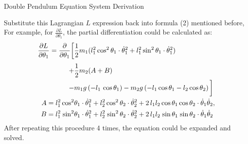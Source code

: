 \documentclass[aspectratio=169, 12pt]{beamer}
\begin{document}
\begin{frame}{Double Pendulum Equation System Derivation}

	\small Substitute this Lagrangian $L$ expression back into formula (2) mentioned before, \\[5pt]
	For example, for $\frac{\partial L}{\partial \theta_1}$, the partial differentiation could be calculated as:
	\begin{align*}
		\frac{\partial L}{\partial \theta_1} = \frac{\partial}{\partial \theta_1} \bigg[ & \frac{1}{2} m_1 (l_1^2 \cos^2{\theta_1}\cdot\dot{\theta}_1^2+l_1^2\sin^2{\theta_1}\cdot\dot{\theta}_1^2)                                                                                       \\[3pt]
		+                                                                                & \frac{1}{2} m_2 (A+B)                                                                                                                                                                          \\
		-                                                                                & m_1g\left( -l_1\,\cos{\theta_1} \right)-m_2g\left( -l_1\cos{\theta_1}-l_2\cos{\theta_2} \right) \bigg]                                                                                         \\
		A = l_1^2\cos^2                                                                  & {\theta_1}\cdot\dot{\theta}_1^2+l_2^2\cos^2{\theta}_2\cdot\dot{\theta}_2^2+2\,l_1l_2\cos{\theta_1}\cos{\theta_2}\cdot\dot{\theta}_1\dot{\theta}_2,                                             \\
		B = l_1^2\hspace{0.11em}\sin^2                                                   & {\theta_1}\cdot\dot{\theta}_1^2+l_2^2\hspace{0.11em}\sin^2{\theta}_2\cdot\dot{\theta}_2^2+2\,l_1l_2\hspace{0.11em}\sin{\theta_1}\hspace{0.11em}\sin{\theta_2}\cdot\dot{\theta}_1\dot{\theta}_2
	\end{align*}
	After repeating this procedure 4 times, the equation could be expanded and solved.

\end{frame}
\end{document}
